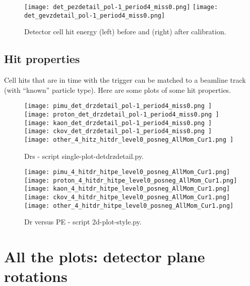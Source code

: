  \begin{figure}	   
 \centering
  \texttt{[image: det\_pezdetail\_pol-1\_period4\_miss0.png]}
   \texttt{[image: det\_gevzdetail\_pol-1\_period4\_miss0.png]}
  \caption{Detector cell hit energy (left) before and (right) after calibration.}			
   \label{fig_detenergyz}
  \end{figure}
%  
%    
\subsection{Hit properties}

Cell hits that are in time with the trigger can be matched to a beamline track (with ``known'' particle type). Here are some plots of some hit properties. 


 \begin{figure}	   
 \centering
  \texttt{[image: pimu\_det\_drzdetail\_pol-1\_period4\_miss0.png ]}
   \texttt{[image: proton\_det\_drzdetail\_pol-1\_period4\_miss0.png ]}
     \texttt{[image: kaon\_det\_drzdetail\_pol-1\_period4\_miss0.png ]}
   \texttt{[image: ckov\_det\_drzdetail\_pol-1\_period4\_miss0.png ]}
     \texttt{[image: other\_4\_hitz\_hitdr\_level0\_posneg\_AllMom\_Cur1.png ]}

  \caption{Drs - script single-plot-detdrzdetail.py.}			
   \label{fig_detdrz}
  \end{figure}
  
   \begin{figure}	   
 \centering
  \texttt{[image: pimu\_4\_hitdr\_hitpe\_level0\_posneg\_AllMom\_Cur1.png]}
   \texttt{[image: proton\_4\_hitdr\_hitpe\_level0\_posneg\_AllMom\_Cur1.png]}
     \texttt{[image: kaon\_4\_hitdr\_hitpe\_level0\_posneg\_AllMom\_Cur1.png]}
   \texttt{[image: ckov\_4\_hitdr\_hitpe\_level0\_posneg\_AllMom\_Cur1.png]}
     \texttt{[image: other\_4\_hitdr\_hitpe\_level0\_posneg\_AllMom\_Cur1.png]}

  \caption{Dr versus PE - script 2d-plot-style.py.}			
   \label{fig_detdrpe}
  \end{figure}







%
\section{All the plots: detector plane rotations}\label{app_fit_XY}

